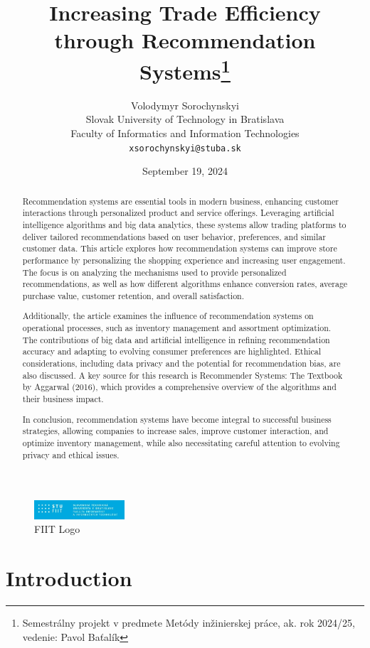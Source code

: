 \documentclass[10pt,twocolumn,twoside,slovak,a4paper]{article}
\title{Increasing Trade Efficiency through Recommendation Systems\thanks{Semestrálny projekt v predmete Metódy inžinierskej práce, ak. rok 2024/25, vedenie: Pavol Baťalík}} %
\author{Volodymyr Sorochynskyi\\[2pt]
	{\small Slovak University of Technology in Bratislava}\\
	{\small Faculty of Informatics and Information Technologies}\\
	{\small \texttt{xsorochynskyi@stuba.sk}}
	}
\date{\small September 19, 2024} %
\begin{document}
\maketitle

\begin{abstract}
Recommendation systems are essential tools in modern business, enhancing customer interactions through personalized product and service offerings. Leveraging artificial intelligence algorithms and big data analytics, these systems allow trading platforms to deliver tailored recommendations based on user behavior, preferences, and similar customer data. This article explores how recommendation systems can improve store performance by personalizing the shopping experience and increasing user engagement. The focus is on analyzing the mechanisms used to provide personalized recommendations, as well as how different algorithms enhance conversion rates, average purchase value, customer retention, and overall satisfaction.

Additionally, the article examines the influence of recommendation systems on operational processes, such as inventory management and assortment optimization. The contributions of big data and artificial intelligence in refining recommendation accuracy and adapting to evolving consumer preferences are highlighted. Ethical considerations, including data privacy and the potential for recommendation bias, are also discussed. A key source for this research is Recommender Systems: The Textbook by Aggarwal (2016), which provides a comprehensive overview of the algorithms and their business impact.

In conclusion, recommendation systems have become integral to successful business strategies, allowing companies to increase sales, improve customer interaction, and optimize inventory management, while also necessitating careful attention to evolving privacy and ethical issues.
\end{abstract}

\begin{figure}[htbp]
    \centering
    \includegraphics[width=0.3\textwidth]{logo.jpg}
    \caption{FIIT Logo}
    \label{fig:fiit_logo}
\end{figure}


\section{Introduction}
\end{document}
